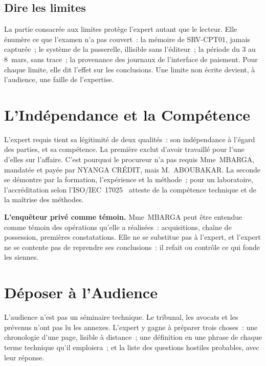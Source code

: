 \subsection{Dire les limites}

La partie consacrée aux limites protège l'expert autant que le lecteur.
Elle énumère ce que l'examen n'a pas couvert~: la mémoire de SRV-CPT01,
jamais capturée~; le système de la passerelle, illisible sans l'éditeur~;
la période du 3 au 8~mars, sans trace~; la provenance des journaux de
l'interface de paiement. Pour chaque limite, elle dit l'effet sur les
conclusions. Une limite non écrite devient, à l'audience, une faille de
l'expertise.

\section{L'Indépendance et la Compétence}
\label{sec:c15-independance}

L'expert requis tient sa légitimité de deux qualités~: son indépendance à
l'égard des parties, et sa compétence. La première exclut d'avoir travaillé
pour l'une d'elles sur l'affaire. C'est pourquoi le procureur n'a pas requis
Mme~MBARGA, mandatée et payée par NYANGA CRÉDIT, mais M.~ABOUBAKAR. La
seconde se démontre par la formation, l'expérience et la méthode~; pour un
laboratoire, l'accréditation selon l'ISO/IEC~17025~\cite{iso17025_2017}
atteste de la compétence technique et de la maîtrise des méthodes.

\begin{boxinfo}
\textbf{L'enquêteur privé comme témoin.} Mme~MBARGA peut être entendue comme
témoin des opérations qu'elle a réalisées~: acquisitions, chaîne de
possession, premières constatations. Elle ne se substitue pas à l'expert,
et l'expert ne se contente pas de reprendre ses conclusions~: il refait ou
contrôle ce qui fonde les siennes.
\end{boxinfo}

\section{Déposer à l'Audience}
\label{sec:c15-audience}

L'audience n'est pas un séminaire technique. Le tribunal, les avocats et
les prévenus n'ont pas lu les annexes. L'expert y gagne à préparer trois
choses~: une chronologie d'une page, lisible à distance~; une définition en
une phrase de chaque terme technique qu'il emploiera~; et la liste des
questions hostiles probables, avec leur réponse.

